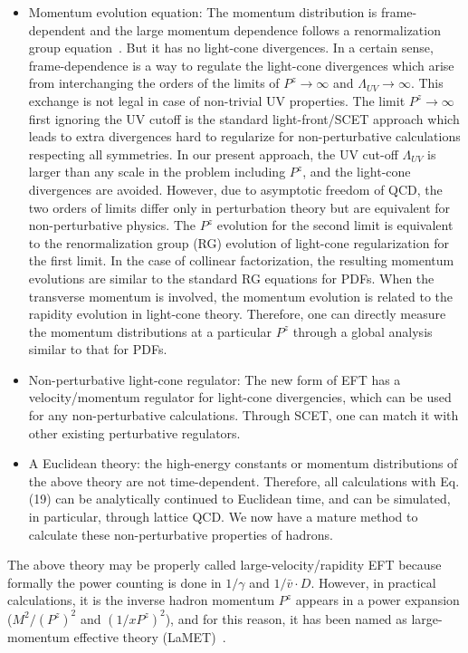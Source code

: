 \documentclass[prd,aps,twocolumn,preprintnumbers,showpacs,nofootinbib,superscriptaddress,notitlepage]{revtex4-1}
\begin{document}
\begin{itemize}
    \item{Momentum evolution equation: The momentum distribution is frame-dependent and the large momentum dependence follows a renormalization group equation~\cite{Ji:2014gla}. But it has no light-cone divergences. In a certain sense, frame-dependence is a way to regulate the light-cone divergences which arise from interchanging the orders of the limits of $P^z \to \infty$ and $\Lambda_{UV} \to \infty$. This exchange is not legal in case of non-trivial UV properties. The limit $P^z\to \infty$ first ignoring the UV cutoff is the standard light-front/SCET approach which leads to extra divergences hard to regularize for non-perturbative calculations respecting all symmetries. In our present approach, the UV cut-off $\Lambda_{UV}$ is larger than any scale in the problem including $P^z$, and the light-cone divergences are avoided. However, due to asymptotic freedom of QCD, the two orders of limits differ only in perturbation theory but are equivalent for non-perturbative physics. The $P^z$ evolution for the second limit is equivalent to the renormalization group (RG) evolution of light-cone regularization for the first limit.   
    In the case of collinear factorization, the resulting momentum evolutions are similar to the standard RG equations for PDFs. When the transverse momentum is involved, the momentum evolution is related to the rapidity evolution in light-cone theory. Therefore, one can directly measure the momentum distributions at a particular $P^z$ through a global analysis similar to that 
    for PDFs.}
    
    \item{Non-perturbative light-cone regulator: The new form of EFT has a velocity/momentum regulator for light-cone divergencies, which can be used for any non-perturbative calculations. Through SCET, one can match it with other existing perturbative regulators.}
    
    \item{A Euclidean theory: the high-energy constants or momentum distributions of the above theory are not time-dependent. 
    Therefore, all calculations with Eq. (19) can be analytically continued to Euclidean time, and can be simulated, in particular, through lattice QCD. We now have a mature method to calculate these non-perturbative properties of hadrons.}
\end{itemize}
The above theory may be properly called large-velocity/rapidity EFT because formally the power counting is done in 
$1/\gamma$ and $1/{\bar v}\cdot D$. However, in practical calculations, it is the inverse hadron momentum $P^z$ appears in a power expansion ($M^2/(P^z)^2$ and $(1/xP^z)^2$), and for this reason, it has been named as large-momentum effective theory (LaMET)~\cite{Ji:2014gla}. 
\end{document}
